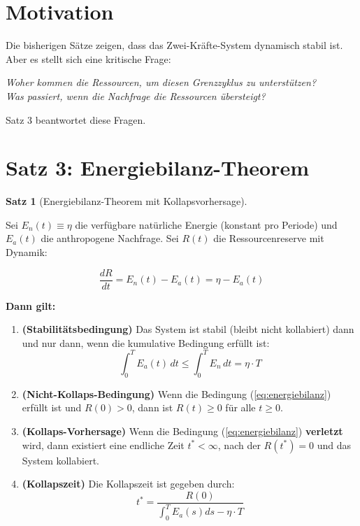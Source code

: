 \documentclass[a4paper,11pt]{report}
\theoremstyle{definition}
\newtheorem{satz}{Satz}[chapter]
\begin{document}
\section{Motivation}

Die bisherigen Sätze zeigen, dass das Zwei-Kräfte-System dynamisch stabil ist. Aber es stellt sich eine kritische Frage:

\begin{center}
    \textit{Woher kommen die Ressourcen, um diesen Grenzzyklus zu unterstützen?}\\
    \textit{Was passiert, wenn die Nachfrage die Ressourcen übersteigt?}
\end{center}

Satz 3 beantwortet diese Fragen.

\section{Satz 3: Energiebilanz-Theorem}

\begin{satz}[Energiebilanz-Theorem mit Kollapsvorhersage]\label{satz:energiebilanz}
    
    Sei $E_n(t) \equiv \eta$ die verfügbare natürliche Energie (konstant pro Periode) und $E_a(t)$ die anthropogene Nachfrage. Sei $R(t)$ die Ressourcenreserve mit Dynamik:
    
    \begin{equation}
        \frac{dR}{dt} = E_n(t) - E_a(t) = \eta - E_a(t)
    \end{equation}
    
    \textbf{Dann gilt:}
    
    \begin{enumerate}
        \item \textbf{(Stabilitätsbedingung)} Das System ist stabil (bleibt nicht kollabiert) dann und nur dann, wenn die kumulative Bedingung erfüllt ist:
        \begin{equation}
            \boxed{\int_0^T E_a(t) \, dt \leq \int_0^T E_n \, dt = \eta \cdot T}
            \label{eq:energiebilanz}
        \end{equation}
        
        \item \textbf{(Nicht-Kollaps-Bedingung)} Wenn die Bedingung (\ref{eq:energiebilanz}) erfüllt ist und $R(0) > 0$, dann ist $R(t) \geq 0$ für alle $t \geq 0$.
        
        \item \textbf{(Kollaps-Vorhersage)} Wenn die Bedingung (\ref{eq:energiebilanz}) \textbf{verletzt} wird, dann existiert eine endliche Zeit $t^* < \infty$, nach der $R(t^*) = 0$ und das System kollabiert.
        
        \item \textbf{(Kollapszeit)} Die Kollapszeit ist gegeben durch:
        \begin{equation}
            \boxed{t^* = \frac{R(0)}{\int_0^T E_a(s) ds - \eta \cdot T}}
            \label{eq:kollapszeit}
        \end{equation}
    \end{enumerate}
\end{satz}
\end{document}
